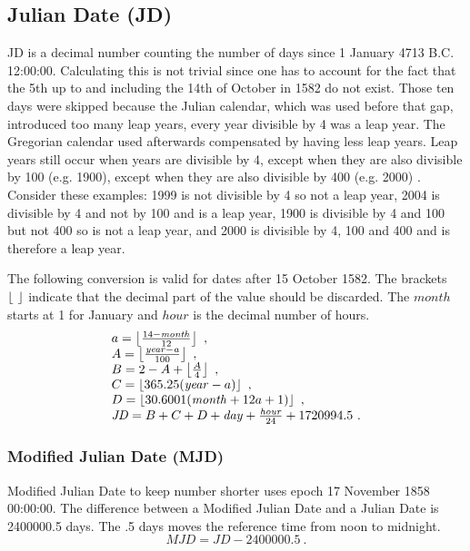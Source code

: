 \subsection{Julian Date (JD)}

JD is a decimal number counting the number of days since 1 January 4713
B.C. 12:00:00. Calculating this is not trivial since one has to account
for the fact that the 5th up to and including the 14th of October in
1582 do not exist. Those ten days were skipped because the Julian
calendar, which was used before that gap, introduced too many leap
years, every year divisible by 4 was a leap year. The Gregorian calendar
used afterwards compensated by having less leap years. Leap years still
occur when years are divisible by 4, except when they are also divisible
by 100 (e.g. 1900), except when they are also divisible by 400 (e.g.
2000) \cite{acf:2014aa}. Consider these examples: 1999 is not divisible
by 4 so not a leap year, 2004 is divisible by 4 and not by 100 and is a
leap year, 1900 is divisible by 4 and 100 but not 400 so is not a leap
year, and 2000 is divisible by 4, 100 and 400 and is therefore a leap
year.

The following conversion is valid for dates after 15 October 1582. The
brackets $\left \lfloor \  \right \rfloor$ indicate that the decimal part of the value should
be discarded. The $\mathit{month}$ starts at 1 for January and
$\mathit{hour}$ is the decimal number of hours.
%
\begin{equation}
    \begin{array}{l}
        a = \left \lfloor \frac{14 - \mathit{month}}{12} \right \rfloor \ , \\
        A = \left \lfloor \frac{\mathit{year - a}}{100} \right \rfloor \ , \\
        B = 2 - A + \left \lfloor \frac{A}{4} \right \rfloor \ , \\
        C = \left \lfloor 365.25 (\mathit{year} - a) \right \rfloor \ , \\
        D = \left \lfloor 30.6001 (\mathit{month} + 12 a + 1) \right \rfloor \ , \\
        \mathit{JD} = B + C + D + \mathit{day} +
                      \frac{\mathit{hour}}{24} + 1720994.5 \ .
    \end{array}
\end{equation}


\subsubsection{Modified Julian Date (MJD)}

Modified Julian Date to keep number shorter uses epoch 17 November 1858
00:00:00. The difference between a Modified Julian Date and a Julian
Date is 2400000.5 days. The .5 days moves the reference time from noon
to midnight.
%
\begin{equation}
    \mathit{MJD} = \mathit{JD} - 2400000.5 \ .
\end{equation}


